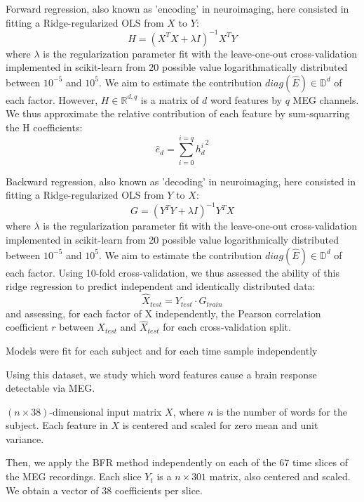 Forward regression, also known as 'encoding' in neuroimaging, here consisted in fitting a Ridge-regularized OLS from $X$ to $Y$:
\begin{equation}
H = (X^{T}X+\lambda I)^{-1} X^{T}Y
\end{equation}
where $\lambda$ is the regularization parameter fit with the leave-one-out cross-validation implemented in scikit-learn \cite{sklearn} from 20 possible value logarithmatically distributed between $10^{-5}$ and $10^5$. We aim to estimate the contribution $diag(\hat E) \in\mathbb{D}^{d} $ of each factor. However, $H\in\mathbb{R}^{d, q}$ is a matrix of $d$ word features by $q$ MEG channels. We thus approximate the relative contribution of each feature by sum-squarring the H coefficients:
\begin{equation}
\hat e_d = \sum_{i=0}^{i=q} {h_d^i}^2
\end{equation}


Backward regression, also known as 'decoding' in neuroimaging, here consisted in fitting a Ridge-regularized OLS from $Y$ to $X$:
\begin{equation}
G = (Y^{T}Y+\lambda I)^{-1} Y^{T}X
\end{equation}
where $\lambda$ is the regularization parameter fit with the leave-one-out cross-validation implemented in scikit-learn \cite{sklearn} from 20 possible value logarithmically distributed between $10^{-5}$ and $10^5$. We aim to estimate the contribution $diag(\hat E) \in\mathbb{D}^{d} $ of each factor. Using 10-fold cross-validation, we thus assessed the ability of this ridge regression to predict independent and identically distributed data:
\begin{equation}
\hat X_{test} = Y_{test}\cdot G_{train}
\end{equation}
and assessing, for each factor of X independently, the Pearson correlation coefficient $r$ between $X_{test}$ and $\hat X_{test}$ for each cross-validation split.

Models were fit for each subject and for each time sample independently

Using this dataset, we study which word features cause a brain response detectable
via MEG.

 $\left(n \times 38\right)$-dimensional input matrix $X$,
where $n$ is the number of words for the subject. Each feature in $X$ is centered and
scaled for zero mean and unit variance.

Then, we apply the BFR method independently on each of the 67 time slices of the
MEG recordings. Each slice $Y_t$ is a $n \times 301$ matrix, also centered and
scaled. We obtain a vector of 38 coefficients per slice.

